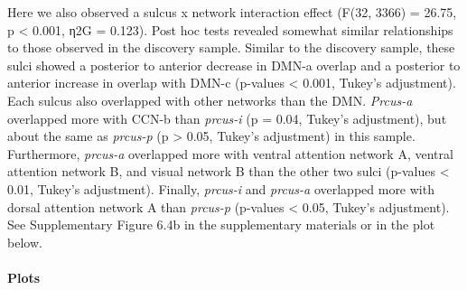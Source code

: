 \documentclass[
]{article}
\begin{document}
Here we also observed a sulcus x network interaction effect (F(32, 3366)
= 26.75, p \textless{} 0.001, η2G = 0.123). Post hoc tests revealed
somewhat similar relationships to those observed in the discovery
sample. Similar to the discovery sample, these sulci showed a posterior
to anterior decrease in DMN-a overlap and a posterior to anterior
increase in overlap with DMN-c (p-values \textless{} 0.001, Tukey's
adjustment). Each sulcus also overlapped with other networks than the
DMN. \emph{Prcus-a} overlapped more with CCN-b than \emph{prcus-i} (p =
0.04, Tukey's adjustment), but about the same as \emph{prcus-p} (p
\textgreater{} 0.05, Tukey's adjustment) in this sample. Furthermore,
\emph{prcus-a} overlapped more with ventral attention network A, ventral
attention network B, and visual network B than the other two sulci
(p-values \textless{} 0.01, Tukey's adjustment). Finally, \emph{prcus-i}
and \emph{prcus-a} overlapped more with dorsal attention network A than
\emph{prcus-p} (p-values \textless{} 0.05, Tukey's adjustment). See
Supplementary Figure 6.4b in the supplementary materials or in the plot
below.

\hypertarget{plots-2}{%
\paragraph{Plots}\label{plots-2}}
\end{document}
